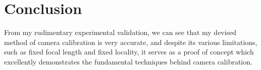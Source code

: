 \section{Conclusion}
From my rudimentary experimental validation, we can see that my devised method of camera calibration is very accurate, and despite its various limitations, such as fixed focal length and fixed locality, it serves as a proof of concept which excellently demonstrates the fundamental techniques behind camera calibration.
